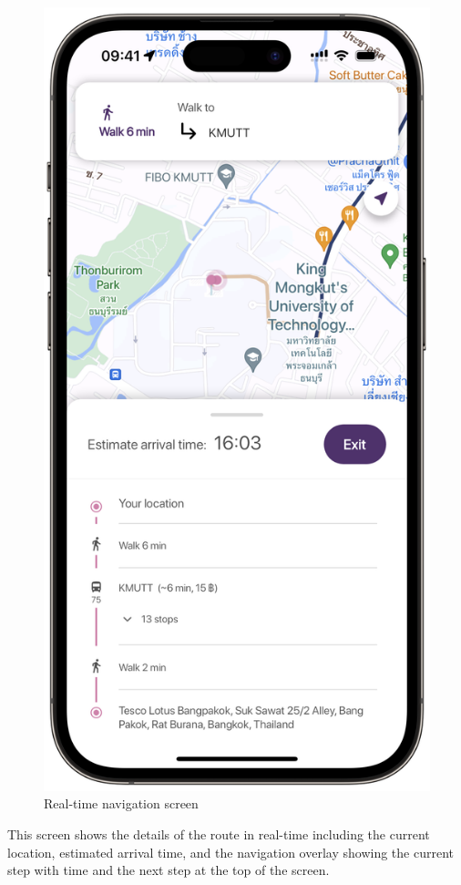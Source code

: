\newpage
\begin{figure}[!h]
	\centering
	\includegraphics[width=0.5\linewidth]{chapter4/real_time_navigation_screen.png}
	\caption{Real-time navigation screen}
	\label{fig:Real-time navigation screen}
\end{figure}
This screen shows the details of the route in real-time including the current location, estimated arrival time, and the navigation overlay showing the current step with time and the next step at the top of the screen.

